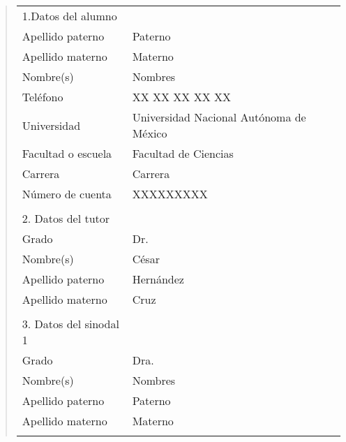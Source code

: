 {\small
\begin{quote}
\begin{tabular}{lll}
1.Datos del alumno          & {}                                          \\
Apellido paterno            & Paterno                                     \\
Apellido materno            & Materno                                     \\
Nombre(s)                   & Nombres                                     \\
Tel\'efono                  & XX XX XX XX XX                              \\
Universidad                 & Universidad Nacional Aut\'onoma de M\'exico \\
Facultad o escuela          & Facultad de Ciencias                        \\
Carrera                     & Carrera                                     \\
N\'umero de cuenta          & XXXXXXXXX                                   \\
{}                          & {}                                          \\
2. Datos del tutor          & {}                                          \\
Grado                       & Dr.                                         \\
Nombre(s)                   & C\'esar                                     \\
Apellido paterno            & Hern\'andez                                 \\
Apellido materno            & Cruz                                        \\
{}                          & {}                                          \\
3. Datos del sinodal 1      & {}                                          \\
Grado                       & Dra.                                        \\
Nombre(s)                   & Nombres                                     \\
Apellido paterno            & Paterno                                     \\
Apellido materno            & Materno                                     \\
{}                          & {}                                          \\

\end{tabular}
\end{quote}}
